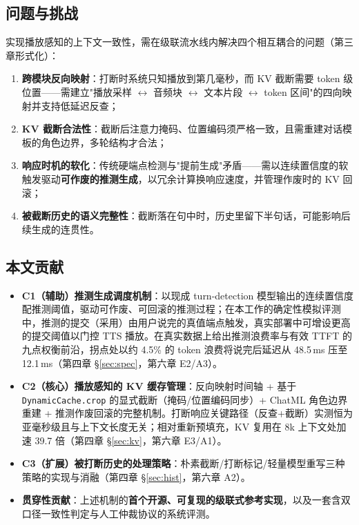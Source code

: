 \documentclass[conference]{IEEEtran}
\theoremstyle{definition}
\begin{document}
\subsection{问题与挑战}
实现播放感知的上下文一致性，需在级联流水线内解决四个相互耦合的问题（第三章形式化）：
\begin{enumerate}
  \item \textbf{跨模块反向映射}：打断时系统只知播放到第几毫秒，而 KV 截断需要 token 级位置——需建立"播放采样 $\leftrightarrow$ 音频块 $\leftrightarrow$ 文本片段 $\leftrightarrow$ token 区间"的四向映射并支持低延迟反查；
  \item \textbf{KV 截断合法性}：截断后注意力掩码、位置编码须严格一致，且需重建对话模板的角色边界，多轮结构才合法；
  \item \textbf{响应时机的软化}：传统硬端点检测与"提前生成"矛盾——需以连续置信度的软触发驱动\textbf{可作废的推测生成}，以冗余计算换响应速度，并管理作废时的 KV 回滚；
  \item \textbf{被截断历史的语义完整性}：截断落在句中时，历史里留下半句话，可能影响后续生成的连贯性。
\end{enumerate}

\subsection{本文贡献}
\begin{itemize}
  \item \textbf{C1（辅助）推测生成调度机制}：以现成 turn-detection 模型输出的连续置信度配推测阈值，驱动可作废、可回滚的推测过程；在本工作的确定性模拟评测中，推测的提交（采用）由用户说完的真值端点触发，真实部署中可增设更高的提交阈值以门控 TTS 播放。在真实数据上给出推测浪费率与有效 TTFT 的九点权衡前沿，拐点处以约 4.5\% 的 token 浪费将说完后延迟从 48.5\,ms 压至 12.1\,ms（第四章 \S\ref{sec:spec}，第六章 E2/A3）。
  \item \textbf{C2（核心）播放感知的 KV 缓存管理}：反向映射时间轴 + 基于 \texttt{DynamicCache.crop} 的显式截断（掩码/位置编码同步）+ ChatML 角色边界重建 + 推测作废回滚的完整机制。打断响应关键路径（反查+截断）实测恒为亚毫秒级且与上下文长度无关；相对重新预填充，KV 复用在 8k 上下文处加速 39.7 倍（第四章 \S\ref{sec:kv}，第六章 E3/A1）。
  \item \textbf{C3（扩展）被打断历史的处理策略}：朴素截断/打断标记/轻量模型重写三种策略的实现与消融（第四章 \S\ref{sec:hist}，第六章 A2）。
  \item \textbf{贯穿性贡献}：上述机制的\textbf{首个开源、可复现的级联式参考实现}，以及一套含双口径一致性判定与人工仲裁协议的系统评测。
\end{itemize}
\end{document}
